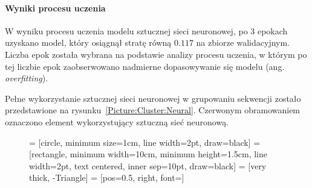 \documentclass{article}
\begin{document}
{            \paragraph{Wyniki procesu uczenia}

                W wyniku procesu uczenia modelu sztucznej sieci neuronowej, po 3 epokach uzyskano model, który osiągnął stratę równą $0.117$ na zbiorze walidacyjnym. Liczba epok została wybrana na podstawie analizy procesu uczenia, w którym po tej liczbie epok zaobserwowano nadmierne dopasowywanie się modelu (ang. \textit{overfitting}).


            Pełne wykorzystanie sztucznej sieci neuronowej w grupowaniu sekwencji zostało przedstawione na rysunku~\ref{Picture:Cluster:Neural}. Czerwonym obramowaniem oznaczono element wykorzystujący sztuczną sieć neuronową.

            \begin{figure}[!htb]
                \begin{center}
                    {

                     = [circle, minimum size=1cm, line width=2pt, draw=black]
                     = [rectangle, minimum width=10cm, minimum height=1.5cm, line width=2pt, text centered, inner sep=10pt, draw=black]
                     = [very thick, -Triangle]
                     = [pos=0.5, right, font=\footnotesize]

                    }
\end{center}
\end{figure}}
\end{document}
